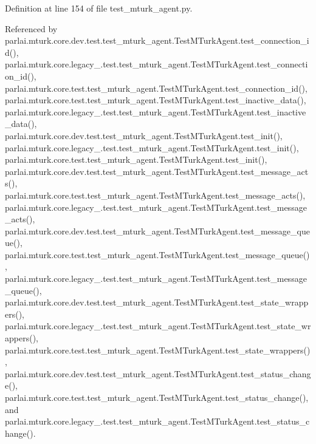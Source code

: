 Definition at line 154 of file test\+\_\+mturk\+\_\+agent.\+py.



Referenced by parlai.\+mturk.\+core.\+dev.\+test.\+test\+\_\+mturk\+\_\+agent.\+Test\+M\+Turk\+Agent.\+test\+\_\+connection\+\_\+id(), parlai.\+mturk.\+core.\+legacy\+\_.\+test.\+test\+\_\+mturk\+\_\+agent.\+Test\+M\+Turk\+Agent.\+test\+\_\+connection\+\_\+id(), parlai.\+mturk.\+core.\+test.\+test\+\_\+mturk\+\_\+agent.\+Test\+M\+Turk\+Agent.\+test\+\_\+connection\+\_\+id(), parlai.\+mturk.\+core.\+test.\+test\+\_\+mturk\+\_\+agent.\+Test\+M\+Turk\+Agent.\+test\+\_\+inactive\+\_\+data(), parlai.\+mturk.\+core.\+legacy\+\_.\+test.\+test\+\_\+mturk\+\_\+agent.\+Test\+M\+Turk\+Agent.\+test\+\_\+inactive\+\_\+data(), parlai.\+mturk.\+core.\+dev.\+test.\+test\+\_\+mturk\+\_\+agent.\+Test\+M\+Turk\+Agent.\+test\+\_\+init(), parlai.\+mturk.\+core.\+legacy\+\_.\+test.\+test\+\_\+mturk\+\_\+agent.\+Test\+M\+Turk\+Agent.\+test\+\_\+init(), parlai.\+mturk.\+core.\+test.\+test\+\_\+mturk\+\_\+agent.\+Test\+M\+Turk\+Agent.\+test\+\_\+init(), parlai.\+mturk.\+core.\+dev.\+test.\+test\+\_\+mturk\+\_\+agent.\+Test\+M\+Turk\+Agent.\+test\+\_\+message\+\_\+acts(), parlai.\+mturk.\+core.\+test.\+test\+\_\+mturk\+\_\+agent.\+Test\+M\+Turk\+Agent.\+test\+\_\+message\+\_\+acts(), parlai.\+mturk.\+core.\+legacy\+\_.\+test.\+test\+\_\+mturk\+\_\+agent.\+Test\+M\+Turk\+Agent.\+test\+\_\+message\+\_\+acts(), parlai.\+mturk.\+core.\+dev.\+test.\+test\+\_\+mturk\+\_\+agent.\+Test\+M\+Turk\+Agent.\+test\+\_\+message\+\_\+queue(), parlai.\+mturk.\+core.\+test.\+test\+\_\+mturk\+\_\+agent.\+Test\+M\+Turk\+Agent.\+test\+\_\+message\+\_\+queue(), parlai.\+mturk.\+core.\+legacy\+\_.\+test.\+test\+\_\+mturk\+\_\+agent.\+Test\+M\+Turk\+Agent.\+test\+\_\+message\+\_\+queue(), parlai.\+mturk.\+core.\+dev.\+test.\+test\+\_\+mturk\+\_\+agent.\+Test\+M\+Turk\+Agent.\+test\+\_\+state\+\_\+wrappers(), parlai.\+mturk.\+core.\+legacy\+\_.\+test.\+test\+\_\+mturk\+\_\+agent.\+Test\+M\+Turk\+Agent.\+test\+\_\+state\+\_\+wrappers(), parlai.\+mturk.\+core.\+test.\+test\+\_\+mturk\+\_\+agent.\+Test\+M\+Turk\+Agent.\+test\+\_\+state\+\_\+wrappers(), parlai.\+mturk.\+core.\+dev.\+test.\+test\+\_\+mturk\+\_\+agent.\+Test\+M\+Turk\+Agent.\+test\+\_\+status\+\_\+change(), parlai.\+mturk.\+core.\+test.\+test\+\_\+mturk\+\_\+agent.\+Test\+M\+Turk\+Agent.\+test\+\_\+status\+\_\+change(), and parlai.\+mturk.\+core.\+legacy\+\_.\+test.\+test\+\_\+mturk\+\_\+agent.\+Test\+M\+Turk\+Agent.\+test\+\_\+status\+\_\+change().

